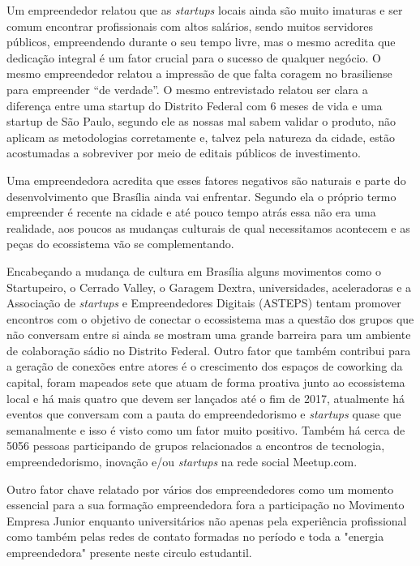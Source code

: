 Um empreendedor relatou que as \textit{startups} locais ainda são muito imaturas e ser comum encontrar profissionais com altos salários, sendo muitos servidores públicos, empreendendo durante o seu tempo livre, mas o mesmo acredita que dedicação integral é um fator crucial para o sucesso de qualquer negócio. O mesmo empreendedor relatou a impressão de que falta coragem no brasiliense para empreender ``de verdade''. O mesmo entrevistado relatou ser clara a diferença entre uma startup do Distrito Federal com 6 meses de vida e uma startup de São Paulo, segundo ele as nossas mal sabem validar o produto, não aplicam as metodologias corretamente e, talvez pela natureza da cidade, estão acostumadas a sobreviver por meio de editais públicos de investimento.

Uma empreendedora acredita que esses fatores negativos são naturais e parte do desenvolvimento que Brasília ainda vai enfrentar. Segundo ela o próprio termo empreender é recente na cidade e até pouco tempo atrás essa não era uma realidade, aos poucos as mudanças culturais de qual necessitamos acontecem e as peças do ecossistema vão se complementando.

Encabeçando a mudança de cultura em Brasília alguns movimentos como o Startupeiro, o Cerrado Valley, o Garagem Dextra, universidades, aceleradoras e a Associação de \textit{startups} e Empreendedores Digitais (ASTEPS) tentam promover encontros com o objetivo de conectar o ecossistema mas a questão dos grupos que não conversam entre si ainda se mostram uma grande barreira para um ambiente de colaboração sádio no Distrito Federal. Outro fator que também contribui para a geração de conexões entre atores é o crescimento dos espaços de coworking da capital, foram mapeados sete que atuam de forma proativa junto ao ecossistema local e há mais quatro que devem ser lançados até o fim de 2017, atualmente há eventos que conversam com a pauta do empreendedorismo e \textit{startups} quase que semanalmente e isso é visto como um fator muito positivo. Também há cerca de 5056 pessoas participando de grupos relacionados a encontros de tecnologia, empreendedorismo, inovação e/ou \textit{startups} na rede social Meetup.com.

Outro fator chave relatado por vários dos empreendedores como um momento essencial para a sua formação empreendedora fora a participação no Movimento Empresa Junior enquanto universitários não apenas pela experiência profissional como também pelas redes de contato formadas no período e toda a "energia empreendedora" presente neste circulo estudantil. 

